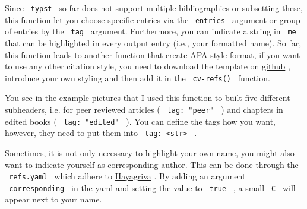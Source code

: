 Since \texttt{\ typst\ } so far does not support multiple bibliographies
or subsetting these, this function let you choose specific entries via
the \texttt{\ entries\ } argument or group of entries by the
\texttt{\ tag\ } argument. Furthermore, you can indicate a string in
\texttt{\ me\ } that can be highlighted in every output entry (i.e.,
your formatted name). So far, this function leads to another function
that create APA-style format, if you want to use any other citation
style, you need to download the template on
\href{https://github.com/bpkleer/modern-acad-cv}{github} , introduce
your own styling and then add it in the \texttt{\ cv-refs()\ } function.

\begin{Shaded}
\begin{Highlighting}[]

\end{Highlighting}
\end{Shaded}

You see in the example pictures that I used this function to built five
different subheaders, i.e. for peer reviewed articles (
\texttt{\ tag:\ "peer"\ } ) and chapters in edited books (
\texttt{\ tag:\ "edited"\ } ). You can define the tags how you want,
however, they need to put them into
\texttt{\ tag:\ \textless{}str\textgreater{}\ } .

Sometimes, it is not only necessary to highlight your own name, you
might also want to indicate yourself as corresponding author. This can
be done through the \texttt{\ refs.yaml\ } which adhere to
\href{https://github.com/typst/hayagriva}{Hayagriva} . By adding an
argument \texttt{\ corresponding\ } in the yaml and setting the value to
\texttt{\ true\ } , a small \texttt{\ C\ } will appear next to your
name.

